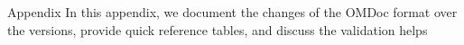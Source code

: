 \begin{appendix}
\begin{omgroup}{Appendix}
  In this appendix, we document the changes of the OMDoc format over the versions,
  provide quick reference tables, and discuss the validation helps

\begin{presonly}
\end{presonly}
\end{omgroup}
\end{appendix}

